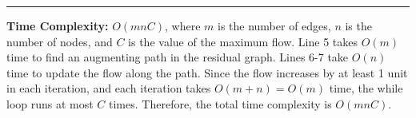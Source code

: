 \begin{Func}

    \vspace{-.5em}
    \begin{algorithm}[H]

        \vspace{.5em}
    \end{algorithm}
    
    \noindent
    \rule{\textwidth}{0.4pt}
    \textbf{Time Complexity:} $O(mnC)$, where $m$ is the number of edges, $n$ is the number of nodes, 
    and $C$ is the value of the maximum flow. Line 5 takes $O(m)$ time to find an augmenting path in the residual graph. Lines 6-7 take $O(n)$ time to update the flow along the path. Since the flow increases by at least 1 unit in each iteration, and each iteration takes $O(m + n) = O(m)$ time, the while loop runs at most $C$ times. Therefore, the total time complexity is $O(mnC)$.

\end{Func}

